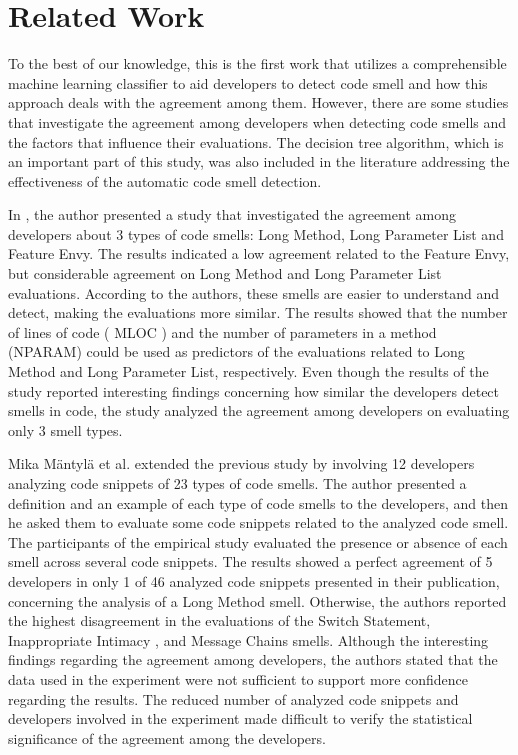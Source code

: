 \chapter{Related Work}
\label{sec:relateds}

To the best of our knowledge, this is the first work that utilizes a comprehensible machine learning classifier to aid developers to detect code smell and how this approach deals with the agreement among them. However, there are some studies that investigate the agreement among developers when detecting code smells and the factors that influence their evaluations. The decision tree algorithm, which is an important part of this study, was also included in the literature addressing the effectiveness of the automatic code smell detection. 

In \cite{mantyla2005experiment}, the author presented a study that investigated the agreement among developers about 3 types of code smells: Long Method, Long Parameter List and Feature Envy. The results indicated a low agreement related to the Feature Envy, but considerable agreement on Long Method and Long Parameter List evaluations. According to the authors, these smells are easier to understand and detect, making the evaluations more similar. The results showed that the number of lines of code ( MLOC ) and the number of parameters in a method (NPARAM) could be used as predictors of the evaluations related to Long Method and Long Parameter List, respectively. Even though the results of the study reported interesting findings concerning how similar the developers detect smells in code, the study analyzed the agreement among developers on evaluating only 3 smell types. 

Mika Mäntylä et al. \cite{mantyla2006subjective} extended the previous study by involving 12 developers analyzing code snippets of 23 types of code smells. The author presented a definition and an example of each type of code smells to the developers, and then he asked them to evaluate some code snippets related to the analyzed code smell. The participants of the empirical study evaluated the presence or absence of each smell across several code snippets. The results showed a perfect agreement of 5 developers in only 1 of 46 analyzed code snippets presented in their publication, concerning the analysis of a Long Method smell. Otherwise, the authors reported the highest disagreement in the evaluations of the Switch Statement, Inappropriate Intimacy , and Message Chains smells. Although the interesting findings regarding the agreement among developers, the authors stated that the data used in the experiment were not sufficient to support more confidence regarding the results. The reduced number of analyzed code snippets and developers involved in the experiment made difficult to verify the statistical significance of the agreement among the developers. 

